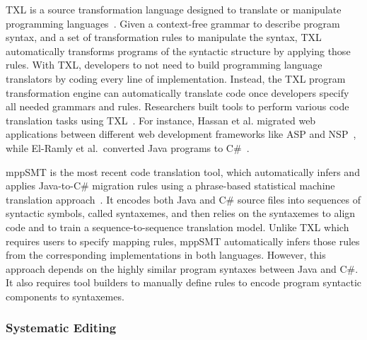 \documentclass[runningheads,a4paper]{llncs}
\begin{document}
TXL is a source transformation language designed to translate or manipulate programming languages~\cite{Cordy2006}. Given a context-free grammar to describe program syntax, and a set of transformation rules to manipulate the syntax, TXL automatically transforms programs of the syntactic structure by applying those rules. With TXL, developers to not need to build programming language translators by coding every line of implementation. Instead, the TXL program transformation engine can automatically translate code once developers specify all needed grammars and rules. Researchers built tools to perform various code translation tasks using TXL~\cite{Chu:08,Hassan:2005,El-Ramly:2006,Tonella:04}. For instance, Hassan et al. migrated web applications between different web development frameworks like ASP and NSP~\cite{Hassan:2005}, while El-Ramly et al.~converted Java programs to C\#~\cite{El-Ramly:2006}. 


mppSMT is the most recent code translation tool, which automatically infers and applies Java-to-C\# migration rules using a phrase-based statistical machine translation approach~\cite{Nguyen:15}. It encodes both Java and C\# source files into sequences of syntactic symbols, called syntaxemes, and then relies on the syntaxemes to align code and to train a sequence-to-sequence translation model. 
Unlike TXL which requires users to specify mapping rules, mppSMT automatically infers those rules from the corresponding implementations in both languages. 
However, this approach depends on the highly similar program syntaxes between Java and C\#. It also requires tool builders to manually define rules to encode program syntactic components to syntaxemes. 

\subsubsection{Systematic Editing}
\label{sec:sysedit}

\end{document}
